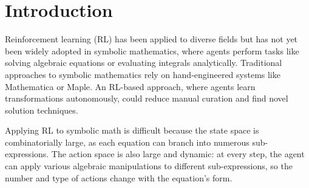 \documentclass{article}
\theoremstyle{plain}
\theoremstyle{definition}
\theoremstyle{remark}
\begin{document}
\begin{abstract}
We explore whether reinforcement learning (RL) can be useful for symbolic mathematics. Previous work showed contrastive learning can solve linear equations in one variable. We show that model-free PPO~\cite{schulman2017proximal} combined with a graph-based policy (TreeMLP), a dynamic per-state action space, and lightweight inductive biases (curriculum, success replay, constant relabeling) can solve nonlinear equations involving radicals, exponentials, and trigonometric functions---reaching or exceeding state-of-the-art accuracy on the CommonCore benchmark. We then turn to \emph{open} equations, whose solution requires a generative change-of-variables (CoV). We expose the CoV as a macroaction within the same dynamic action space and train a single policy on a mixed dataset of closed and open equations. A combination of training-time and decoding-time interventions -- an action-diversity penalty, a freshness-managed success-replay buffer, a cube-root action, and value-guided beam search with canonical-state deduplication -- raises open-equation test accuracy from $0.27$ (plain baseline) to a 5-seed mean of $0.78$ (range $0.47$--$0.91$), solving the quadratic, cubic, quartic, and exponential change-of-variables classes. To our knowledge this is the first RL agent to solve open algebraic equations end-to-end without supervised solution traces.
\end{abstract}

\section{Introduction}
Reinforcement learning (RL) has been applied to diverse fields \citep{ng2006autonomous, degrave2022magnetic, vinyals2019grandmaster} but has not yet been widely adopted in symbolic mathematics, where agents perform tasks like solving algebraic equations or evaluating integrals analytically. Traditional approaches to symbolic mathematics rely on hand-engineered systems like Mathematica or Maple. An RL-based approach, where agents learn transformations autonomously, could reduce manual curation and find novel solution techniques.

Applying RL to symbolic math is difficult because the state space is combinatorially large, as each equation can branch into numerous sub-expressions. The action space is also large and dynamic: at every step, the agent can apply various algebraic manipulations to different sub-expressions, so the number and type of actions change with the equation's form.
\end{document}
